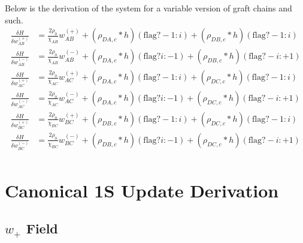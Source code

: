 \documentclass{article}
\begin{document}
 Below is the derivation of the system for a variable version of graft chains and such.
  \begin{align*}
    \frac{\delta H}{\delta w_{AB}^{(+)}} 
    &= \frac{2 \rho_0}{\chi_{AB}}  w_{AB}^{(+)}
    + (\rho_{DA,c} * h)(\text{flag} ? -1 : i)
    + (\rho_{DB,c} * h)(\text{flag} ? -1 : i)
    \\
    \frac{\delta H}{\delta w_{AB}^{(-)}} 
    &= \frac{2 \rho_0}{\chi_{AB}} w_{AB}^{(-)} 
    + (\rho_{DA,c} * h)(\text{flag} ? i : -1)
    + (\rho_{DB,c} * h)(\text{flag} ? -i : +1)
    \\
    \frac{\delta H}{\delta w_{AC}^{(+)}} 
    &= \frac{2 \rho_0}{\chi_{AC}}  w_{AC}^{(+)}
    + (\rho_{DA,c} * h)(\text{flag} ? -1 : i)
    + (\rho_{DC,c} * h)(\text{flag} ? -1 : i)
    \\
    \frac{\delta H}{\delta w_{AC}^{(-)}} 
    &= \frac{2 \rho_0}{\chi_{AC}} w_{AC}^{(-)}
    + (\rho_{DA,c} * h)(\text{flag} ? i : -1)
    + (\rho_{DC,c} * h)(\text{flag} ? -i : +1)
    \\
    \frac{\delta H}{\delta w_{BC}^{(+)}} 
    &= \frac{2 \rho_0}{\chi_{BC}}  w_{BC}^{(+)}
    + (\rho_{DB,c} * h)(\text{flag} ? -1 : i)
    + (\rho_{DC,c} * h)(\text{flag} ? -1 : i)
    \\
    \frac{\delta H}{\delta w_{BC}^{(-)}} 
    &= \frac{2 \rho_0}{\chi_{BC}}  w_{BC}^{(-)}
    + (\rho_{DB,c} * h)(\text{flag} ? i : -1)
    + (\rho_{DC,c} * h)(\text{flag} ? -i : +1)
    \\
  \end{align*}
  
  \section{Canonical 1S Update Derivation}
  
  \subsection{$w_+$ Field}
  
\end{document}
